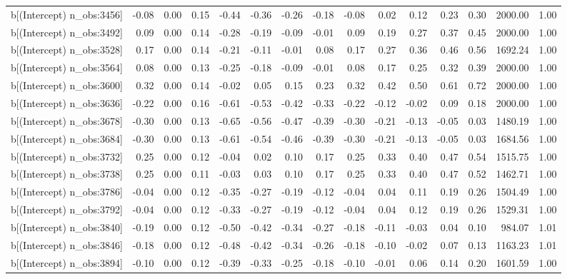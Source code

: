 \begin{table}[ht]
\begin{tabular}{rrrrrrrrrrrrrrr}
  b[(Intercept) n\_obs:3456] & -0.08 & 0.00 & 0.15 & -0.44 & -0.36 & -0.26 & -0.18 & -0.08 & 0.02 & 0.12 & 0.23 & 0.30 & 2000.00 & 1.00 \\ 
  b[(Intercept) n\_obs:3492] & 0.09 & 0.00 & 0.14 & -0.28 & -0.19 & -0.09 & -0.01 & 0.09 & 0.19 & 0.27 & 0.37 & 0.45 & 2000.00 & 1.00 \\ 
  b[(Intercept) n\_obs:3528] & 0.17 & 0.00 & 0.14 & -0.21 & -0.11 & -0.01 & 0.08 & 0.17 & 0.27 & 0.36 & 0.46 & 0.56 & 1692.24 & 1.00 \\ 
  b[(Intercept) n\_obs:3564] & 0.08 & 0.00 & 0.13 & -0.25 & -0.18 & -0.09 & -0.01 & 0.08 & 0.17 & 0.25 & 0.32 & 0.39 & 2000.00 & 1.00 \\ 
  b[(Intercept) n\_obs:3600] & 0.32 & 0.00 & 0.14 & -0.02 & 0.05 & 0.15 & 0.23 & 0.32 & 0.42 & 0.50 & 0.61 & 0.72 & 2000.00 & 1.00 \\ 
  b[(Intercept) n\_obs:3636] & -0.22 & 0.00 & 0.16 & -0.61 & -0.53 & -0.42 & -0.33 & -0.22 & -0.12 & -0.02 & 0.09 & 0.18 & 2000.00 & 1.00 \\ 
  b[(Intercept) n\_obs:3678] & -0.30 & 0.00 & 0.13 & -0.65 & -0.56 & -0.47 & -0.39 & -0.30 & -0.21 & -0.13 & -0.05 & 0.03 & 1480.19 & 1.00 \\ 
  b[(Intercept) n\_obs:3684] & -0.30 & 0.00 & 0.13 & -0.61 & -0.54 & -0.46 & -0.39 & -0.30 & -0.21 & -0.13 & -0.05 & 0.03 & 1684.56 & 1.00 \\ 
  b[(Intercept) n\_obs:3732] & 0.25 & 0.00 & 0.12 & -0.04 & 0.02 & 0.10 & 0.17 & 0.25 & 0.33 & 0.40 & 0.47 & 0.54 & 1515.75 & 1.00 \\ 
  b[(Intercept) n\_obs:3738] & 0.25 & 0.00 & 0.11 & -0.03 & 0.03 & 0.10 & 0.17 & 0.25 & 0.33 & 0.40 & 0.47 & 0.52 & 1462.71 & 1.00 \\ 
  b[(Intercept) n\_obs:3786] & -0.04 & 0.00 & 0.12 & -0.35 & -0.27 & -0.19 & -0.12 & -0.04 & 0.04 & 0.11 & 0.19 & 0.26 & 1504.49 & 1.00 \\ 
  b[(Intercept) n\_obs:3792] & -0.04 & 0.00 & 0.12 & -0.33 & -0.27 & -0.19 & -0.12 & -0.04 & 0.04 & 0.12 & 0.19 & 0.26 & 1529.31 & 1.00 \\ 
  b[(Intercept) n\_obs:3840] & -0.19 & 0.00 & 0.12 & -0.50 & -0.42 & -0.34 & -0.27 & -0.18 & -0.11 & -0.03 & 0.04 & 0.10 & 984.07 & 1.01 \\ 
  b[(Intercept) n\_obs:3846] & -0.18 & 0.00 & 0.12 & -0.48 & -0.42 & -0.34 & -0.26 & -0.18 & -0.10 & -0.02 & 0.07 & 0.13 & 1163.23 & 1.01 \\ 
  b[(Intercept) n\_obs:3894] & -0.10 & 0.00 & 0.12 & -0.39 & -0.33 & -0.25 & -0.18 & -0.10 & -0.01 & 0.06 & 0.14 & 0.20 & 1601.59 & 1.00 \\ 

\end{tabular}
\end{table}
